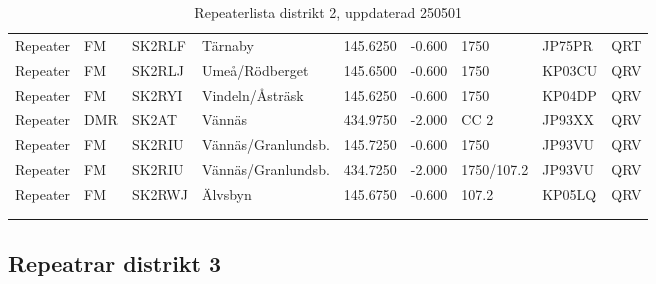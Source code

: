 \begin{longtable}{llllrrlll}
Repeater   & FM          & SK2RLF    & Tärnaby            & 145.6250     & -0.600     & 1750       & JP75PR      & QRT      \\
Repeater   & FM          & SK2RLJ    & Umeå/Rödberget     & 145.6500     & -0.600     & 1750       & KP03CU      & QRV      \\
Repeater   & FM          & SK2RYI    & Vindeln/Åsträsk    & 145.6250     & -0.600     & 1750       & KP04DP      & QRV      \\
Repeater   & DMR         & SK2AT     & Vännäs             & 434.9750     & -2.000     & CC 2       & JP93XX      & QRV      \\
Repeater   & FM          & SK2RIU    & Vännäs/Granlundsb. & 145.7250     & -0.600     & 1750       & JP93VU      & QRV      \\
Repeater   & FM          & SK2RIU    & Vännäs/Granlundsb. & 434.7250     & -2.000     & 1750/107.2 & JP93VU      & QRV      \\
Repeater   & FM          & SK2RWJ    & Älvsbyn            & 145.6750     & -0.600     & 107.2      & KP05LQ      & QRV      \\
\vspace{1 ex}                                                                                                               \\
\caption{Repeaterlista distrikt 2, uppdaterad 250501}                                                                       \\
\end{longtable}

\clearpage

\subsection{Repeatrar distrikt 3}

